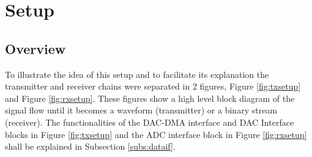 \section{Setup}
\label{impl:setup}

\subsection{Overview}

%
%
%

To illustrate the idea of this setup and to facilitate its explanation the
transmitter and receiver chains were separated in 2 figures, Figure
\ref{fig:txsetup} and Figure \ref{fig:rxsetup}. These figures show a high level
block diagram of the signal flow until it becomes a waveform (transmitter) or a
binary stream (receiver). The functionalities of the  DAC-DMA interface and DAC
Interface blocks in Figure \ref{fig:txsetup} and the ADC interface block in
Figure \ref{fig:rxsetup} shall be explained in Subsection \ref{subs:dataif}.

